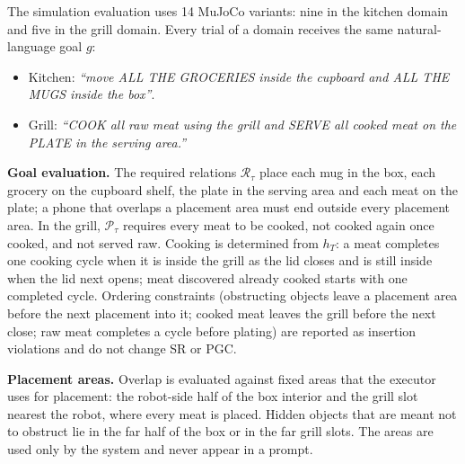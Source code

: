 The simulation evaluation uses 14 MuJoCo variants: nine in the kitchen domain and five in the grill
domain. Every trial of a domain receives the same natural-language goal $g$:
\begin{itemize}
\item Kitchen: \emph{``move ALL THE GROCERIES inside the cupboard and ALL THE MUGS inside the box''}.
\item Grill: \emph{``COOK all raw meat using the grill and SERVE all cooked meat on the PLATE in the serving area.''}
\end{itemize}

\noindent\textbf{Goal evaluation.} The required relations $\mathcal{R}_\tau$ place each mug in the box,
each grocery on the cupboard shelf, the plate in the serving area and each meat on the plate; a phone
that overlaps a placement area must end outside every placement area. In the grill, $\mathcal{P}_\tau$
requires every meat to be cooked, not cooked again once cooked, and not served raw. Cooking is
determined from $h_T$: a meat completes one cooking cycle when it is inside the grill as the lid closes
and is still inside when the lid next opens; meat discovered already cooked starts with one completed
cycle. Ordering constraints (obstructing objects leave a placement area before the next placement into
it; cooked meat leaves the grill before the next close; raw meat completes a cycle before plating) are
reported as insertion violations and do not change SR or PGC.

\noindent\textbf{Placement areas.} Overlap is evaluated against fixed areas that the executor uses for
placement: the robot-side half of the box interior and the grill slot nearest the robot, where every
meat is placed. Hidden objects that are meant not to obstruct lie in the far half of the box or in the
far grill slots. The areas are used only by the system and never appear in a prompt.

